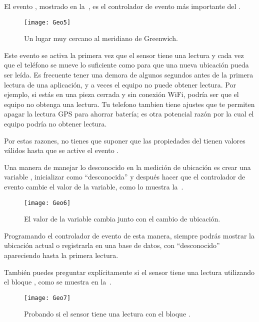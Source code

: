 El evento , mostrado en
la~, es el controlador de evento más importante del
.

\begin{figure}[H]
  \centering
  \texttt{[image: Geo5]}
  \caption{Un lugar muy cercano al meridiano de Greenwich.}
  \label{fig:Geo5}
\end{figure}

Este evento se activa la primera vez que el sensor tiene una lectura y
cada vez que el teléfono se mueve lo suficiente como para que una
nueva ubicación pueda ser leída. Es frecuente tener una demora de
algunos segundos antes de la primera lectura de una aplicación, y a
veces el equipo no puede obtener lectura. Por ejemplo, si estás en una
pieza cerrada y sin conexión WiFi, podría ser que el equipo no obtenga
una lectura. Tu telefono tambien tiene ajustes que te permiten apagar
la lectura GPS para ahorrar batería; es otra potencial razón por la
cual el equipo podría no obtener lectura.

Por estas razones, no tienes que suponer que las propiedades del
 tienen valores válidos hasta que se
active el evento .

Una manera de manejar lo desconocido en la medición de ubicación es crear
una variable , inicializar como
``desconocida'' y después hacer que el controlador de evento cambie el valor
de la variable, como lo muestra la~.

\begin{figure}[H]
  \centering
  \texttt{[image: Geo6]}
  \caption{El valor de la variable 
    cambia junto con el cambio de ubicación.}
  \label{fig:Geo6}
\end{figure}

Programando el controlador de evento
 de esta manera, siempre
  podrás mostrar la ubicación actual o registrarla en una base de
  datos, con ``desconocido'' apareciendo hasta la primera lectura.

También puedes preguntar explícitamente si el sensor tiene una lectura
utilizando el bloque ,
como se muestra en la~.

\begin{figure}[H]
  \centering
  \texttt{[image: Geo7]}
  \caption{Probando si el sensor tiene una lectura con el bloque .}
  \label{fig:Geo7}
\end{figure}

